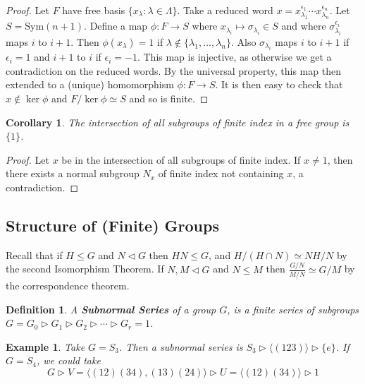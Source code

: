 \documentclass[a4paper,10pt]{article}
\newtheorem{Def}[thm]{Definition}
\newtheorem{Cor}[thm]{Corollary}
\newtheorem{eg}[thm]{Example}
\begin{document}
\begin{proof}
Let $F$ have free basis $\{ x_\lambda : \lambda \in \Lambda \}$. Take a reduced word $x = x_{\lambda_1}^{\epsilon_1} \cdots x_{\lambda_n}^{\epsilon_n}$. Let $S = \text{Sym}(n+1)$. Define a map $\phi : F \rightarrow S$ where $x_{\lambda_i} \mapsto \sigma_{\lambda_i} \in S$ and where $\sigma_{\lambda_i}^{\epsilon_i}$ maps $i$ to $i+1$. Then $\phi(x_\lambda) = 1$ if $\lambda \notin \{\lambda_1, \dots, \lambda_n \}$. Also $\sigma_{\lambda_i}$ maps $i$ to $i+1$ if $\epsilon_i =1$ and $i+1$ to $i$ if $\epsilon_i = -1$. This map is injective, as otherwise we get a contradiction on the reduced words. By the universal property, this map then extended to a (unique) homomorphism $\phi : F \rightarrow S$. It is then easy to check that $x \notin \ker \phi$ and $F / \ker \phi \simeq S$ and so is finite.
\end{proof}

\begin{Cor}
The intersection of all subgroups of finite index in a free group is $\{1\}$.
\end{Cor}

\begin{proof}
Let $x$ be in the intersection of all subgroups of finite index. If $x \neq 1$, then there exists a normal subgroup $N_x$ of finite index not containing $x$, a contradiction.
\end{proof}


\subsection{Structure of (Finite) Groups}

Recall that if $H \leq G$ and $N \triangleleft G$ then $HN \leq G$, and $H / (H \cap N) \simeq NH / N$ by the second Isomorphism Theorem. If $N,M \triangleleft G$ and $N \leq M$ then $\frac{G / N}{M / N} \simeq G / M$ by the correspondence theorem.  

\begin{Def}
A \textbf{Subnormal Series} of a group $G$, is a finite series of subgroups $G = G_0 \triangleright G_1 \triangleright G_2 \triangleright \cdots \triangleright G_r = 1$.
\end{Def}

\begin{eg}
Take $G = S_3$. Then a subnormal series is $S_3 \triangleright \langle (123) \rangle \triangleright \{e\}$. If $G = S_4$, we could take
\[ G \triangleright V = \langle (12)(34), (13)(24) \rangle \triangleright U = \langle (12)(34) \rangle \triangleright 1 \] 
\end{eg}
\end{document}
